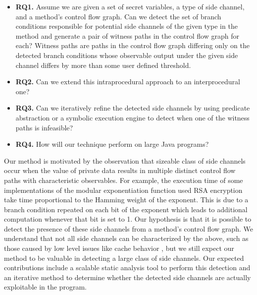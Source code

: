 \begin{itemize}
\item[] \textbf{RQ1.} Assume we are given a set of secret variables, a type of side channel, and a method's control flow graph. Can we detect the set of branch conditions responsible for potential side channels of the given type in the method and generate a pair of witness paths in the control flow graph for each? Witness paths are paths in the control flow graph differing only on the detected branch conditions whose observable output under the given side channel differs by more than some user defined threshold. 
\item[] \textbf{RQ2.} Can we extend this intraprocedural approach to an interprocedural one? 
\item[] \textbf{RQ3.} Can we iteratively refine the detected side channels by using predicate abstraction or a symbolic execution engine to detect when one of the witness paths is infeasible?
\item[] \textbf{RQ4.} How will our technique perform on large Java programs?
\end{itemize}

Our method is motivated by the observation that sizeable class of side channels occur when the value of private data results in multiple distinct control flow paths with characteristic observables. For example, the execution time of some implementations of the modular exponentiation function used RSA encryption take time proportional to the Hamming weight of the exponent. This is due to a branch condition repeated on each bit of the exponent which leads to additional computation whenever that bit is set to 1. Our hypothesis is that it is possible to detect the presence of these side channels from a method's control flow graph. We understand that not all side channels can be characterized by the above, such as those caused by low level issues like cache behavior \cite{cache}, but we still expect our method to be valuable in detecting a large class of side channels. Our expected contributions include a scalable static analysis tool to perform this detection and an iterative method to determine whether the detected side channels are actually exploitable in the program.
